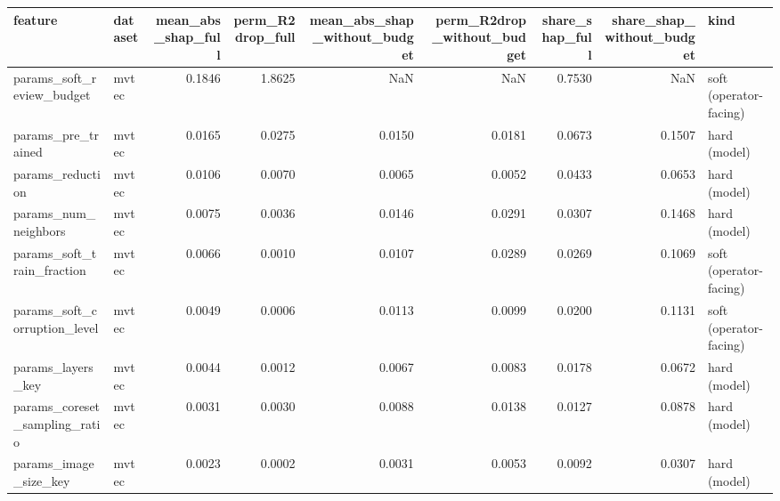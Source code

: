 \begin{tabular}{llrrrrrrl}
\toprule
                      feature &  dataset &  mean\_abs\_shap\_full &  perm\_R2drop\_full &  mean\_abs\_shap\_without\_budget &  perm\_R2drop\_without\_budget &  share\_shap\_full &  share\_shap\_without\_budget &                   kind \\
\midrule
    params\_soft\_review\_budget &    mvtec &              0.1846 &            1.8625 &                           NaN &                         NaN &           0.7530 &                        NaN & soft (operator-facing) \\
           params\_pre\_trained &    mvtec &              0.0165 &            0.0275 &                        0.0150 &                      0.0181 &           0.0673 &                     0.1507 &           hard (model) \\
             params\_reduction &    mvtec &              0.0106 &            0.0070 &                        0.0065 &                      0.0052 &           0.0433 &                     0.0653 &           hard (model) \\
         params\_num\_neighbors &    mvtec &              0.0075 &            0.0036 &                        0.0146 &                      0.0291 &           0.0307 &                     0.1468 &           hard (model) \\
   params\_soft\_train\_fraction &    mvtec &              0.0066 &            0.0010 &                        0.0107 &                      0.0289 &           0.0269 &                     0.1069 & soft (operator-facing) \\
 params\_soft\_corruption\_level &    mvtec &              0.0049 &            0.0006 &                        0.0113 &                      0.0099 &           0.0200 &                     0.1131 & soft (operator-facing) \\
            params\_layers\_key &    mvtec &              0.0044 &            0.0012 &                        0.0067 &                      0.0083 &           0.0178 &                     0.0672 &           hard (model) \\
params\_coreset\_sampling\_ratio &    mvtec &              0.0031 &            0.0030 &                        0.0088 &                      0.0138 &           0.0127 &                     0.0878 &           hard (model) \\
        params\_image\_size\_key &    mvtec &              0.0023 &            0.0002 &                        0.0031 &                      0.0053 &           0.0092 &                     0.0307 &           hard (model) \\

\end{tabular}
